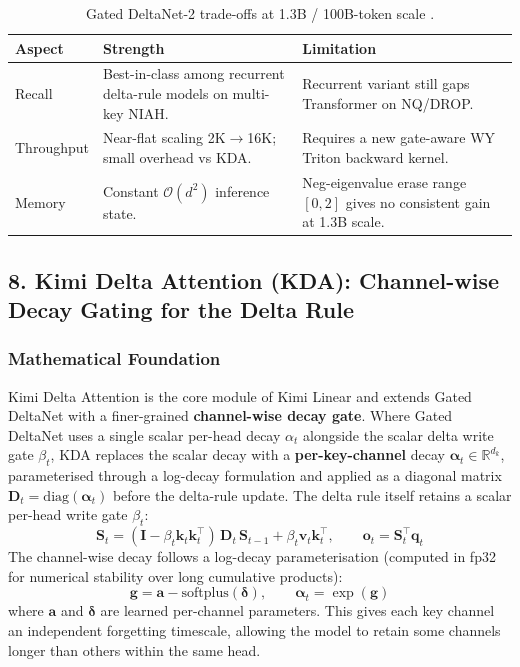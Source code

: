 \begin{table}[H]
\centering
\footnotesize
\begin{tabularx}{\linewidth}{lXX}
\toprule
\textbf{Aspect} & \textbf{Strength} & \textbf{Limitation} \\
\midrule
Recall & Best-in-class among recurrent delta-rule models on multi-key NIAH. & Recurrent variant still gaps Transformer on NQ/DROP. \\
Throughput & Near-flat scaling 2K$\to$16K; small overhead vs KDA. & Requires a new gate-aware WY Triton backward kernel. \\
Memory & Constant $\mathcal{O}(d^2)$ inference state. & Neg-eigenvalue erase range $[0,2]$ gives no consistent gain at 1.3B scale. \\
\bottomrule
\end{tabularx}
\caption{Gated DeltaNet-2 trade-offs at 1.3B / 100B-token scale \citep{hatamizadeh_gated_deltanet2_2026}.}
\label{tab:gated-deltanet2-tradeoffs}
\end{table}

\normalsize

\subsection{8. Kimi Delta Attention (KDA): Channel-wise Decay Gating for the Delta Rule}

\subsubsection{Mathematical Foundation}

Kimi Delta Attention \citep{kimi_kda_2025} is the core module of Kimi Linear and extends Gated DeltaNet with a finer-grained \textbf{channel-wise decay gate}. Where Gated DeltaNet uses a single scalar per-head decay $\alpha_t$ alongside the scalar delta write gate $\beta_t$, KDA replaces the scalar decay with a \textbf{per-key-channel} decay $\boldsymbol{\alpha}_t \in \mathbb{R}^{d_k}$, parameterised through a log-decay formulation and applied as a diagonal matrix $\mathbf{D}_t = \mathrm{diag}(\boldsymbol{\alpha}_t)$ before the delta-rule update. The delta rule itself retains a scalar per-head write gate $\beta_t$:
\[
\mathbf{S}_t = (\mathbf{I} - \beta_t \mathbf{k}_t \mathbf{k}_t^\top)\, \mathbf{D}_t\, \mathbf{S}_{t-1} + \beta_t \mathbf{v}_t \mathbf{k}_t^\top, \qquad \mathbf{o}_t = \mathbf{S}_t^\top \mathbf{q}_t
\]
The channel-wise decay follows a log-decay parameterisation (computed in fp32 for numerical stability over long cumulative products):
\[
\mathbf{g} = \mathbf{a} - \mathrm{softplus}(\boldsymbol{\delta}), \qquad \boldsymbol{\alpha}_t = \exp(\mathbf{g})
\]
where $\mathbf{a}$ and $\boldsymbol{\delta}$ are learned per-channel parameters. This gives each key channel an independent forgetting timescale, allowing the model to retain some channels longer than others within the same head.

